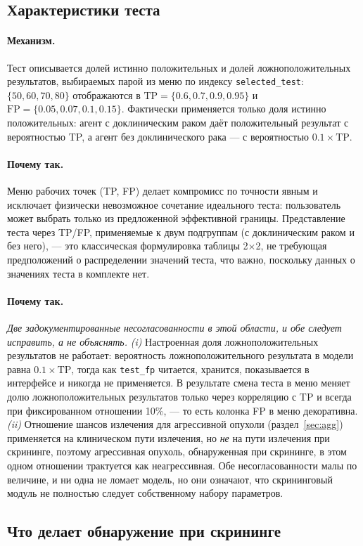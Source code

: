 \documentclass[12pt,a4paper]{article}
\newcommand{\id}[1]{\texttt{#1}}
\newcommand{\mech}[1]{\paragraph{Механизм.} #1}
\newcommand{\why}[1]{\paragraph{Почему так.} #1}
\begin{document}
\subsection{Характеристики теста}

\mech{Тест описывается долей истинно положительных и долей ложноположительных результатов, выбираемых парой
из меню по индексу \id{selected\_test}: $\{50,60,70,80\}$ отображаются в
$\text{TP} = \{0.6,0.7,0.9,0.95\}$ и $\text{FP} = \{0.05,0.07,0.1,0.15\}$. Фактически применяется только доля
истинно положительных: агент с доклиническим раком даёт положительный результат с вероятностью TP, а агент
без доклинического рака --- с вероятностью $0.1\times\text{TP}$.}

\why{Меню рабочих точек (TP, FP) делает компромисс по точности явным и исключает физически невозможное
сочетание идеального теста: пользователь может выбрать только из предложенной эффективной границы.
Представление теста через TP/FP, применяемые к двум подгруппам (с доклиническим раком и без него), --- это
классическая формулировка таблицы 2$\times$2, не требующая предположений о распределении значений теста, что
важно, поскольку данных о значениях теста в комплекте нет.}

\why{\emph{Две задокументированные несогласованности в этой области, и обе следует исправить, а не
объяснять.} \emph{(i)} Настроенная доля ложноположительных результатов не работает: вероятность
ложноположительного результата в модели равна $0.1\times\text{TP}$, тогда как \id{test\_fp} читается,
хранится, показывается в интерфейсе и никогда не применяется. В результате смена теста в меню меняет долю
ложноположительных результатов только через корреляцию с TP и всегда при фиксированном отношении 10\%, ---
то есть колонка FP в меню декоративна. \emph{(ii)} Отношение шансов излечения для агрессивной опухоли
(раздел~\ref{sec:agg}) применяется на клиническом пути излечения, но \emph{не} на пути излечения при
скрининге, поэтому агрессивная опухоль, обнаруженная при скрининге, в этом одном отношении трактуется как
неагрессивная. Обе несогласованности малы по величине, и ни одна не ломает модель, но они означают, что
скрининговый модуль не полностью следует собственному набору параметров.}

\subsection{Что делает обнаружение при скрининге}
\end{document}
